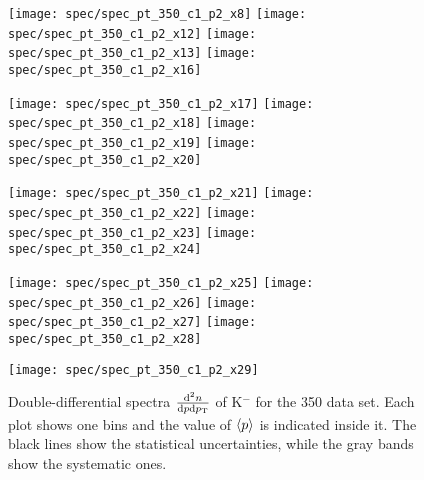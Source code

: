\begin{figure}[!ht]
  \centering

  \texttt{[image: spec/spec\_pt\_350\_c1\_p2\_x8]}
  \texttt{[image: spec/spec\_pt\_350\_c1\_p2\_x12]}
  \texttt{[image: spec/spec\_pt\_350\_c1\_p2\_x13]}
  \texttt{[image: spec/spec\_pt\_350\_c1\_p2\_x16]}

  \texttt{[image: spec/spec\_pt\_350\_c1\_p2\_x17]}
  \texttt{[image: spec/spec\_pt\_350\_c1\_p2\_x18]}
  \texttt{[image: spec/spec\_pt\_350\_c1\_p2\_x19]}
  \texttt{[image: spec/spec\_pt\_350\_c1\_p2\_x20]}

  \texttt{[image: spec/spec\_pt\_350\_c1\_p2\_x21]}
  \texttt{[image: spec/spec\_pt\_350\_c1\_p2\_x22]}
  \texttt{[image: spec/spec\_pt\_350\_c1\_p2\_x23]}
  \texttt{[image: spec/spec\_pt\_350\_c1\_p2\_x24]}

  \texttt{[image: spec/spec\_pt\_350\_c1\_p2\_x25]}
  \texttt{[image: spec/spec\_pt\_350\_c1\_p2\_x26]}
  \texttt{[image: spec/spec\_pt\_350\_c1\_p2\_x27]}
  \texttt{[image: spec/spec\_pt\_350\_c1\_p2\_x28]}

  \texttt{[image: spec/spec\_pt\_350\_c1\_p2\_x29]}
 
 \caption{Double-differential spectra $\frac{\text{d}^2n}{\text{d}p\text{d}p_\text{T}}$
    of K$^-$ for the 350 \GeVc data set. Each plot shows one \pp bins and the value
    of $\langle p\rangle$ is indicated inside it. The black lines show the statistical
    uncertainties, while the gray bands show the systematic ones.}
  \label{fig:hadron:spec:dedx:all350:c1p2}
\end{figure}


